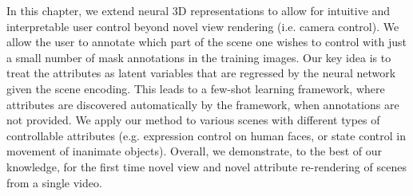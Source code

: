 In this chapter, we extend neural 3D representations to allow for intuitive
and interpretable user control beyond novel view rendering (i.e. camera
control).
We allow the user to annotate which part of the scene one wishes to control
with just a small number of mask annotations in the training images.
Our key idea is to treat the attributes as latent variables that are regressed
by the neural network given the scene encoding.
This leads to a few-shot learning framework, where attributes are discovered
automatically by the framework, when annotations are not provided.
We apply our method to various scenes with different types of controllable
attributes (e.g. expression control on human faces, or state control in
movement of inanimate objects).
Overall, we demonstrate, to the best of our knowledge, for the first time
novel view and novel attribute re-rendering of scenes from a single video.
